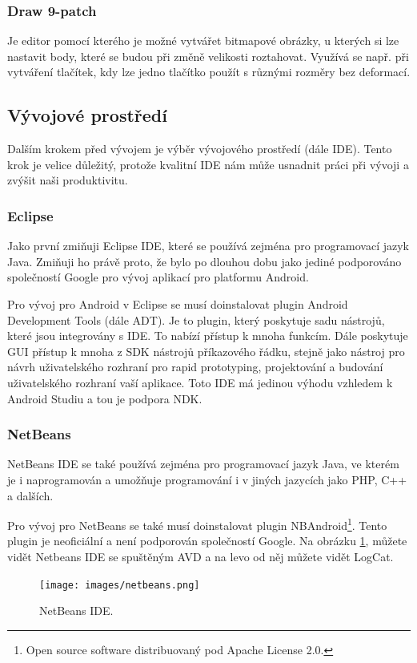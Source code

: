 \documentclass[12pt]{article}
\begin{document}
\subsubsection{Draw 9-patch}
Je editor pomocí kterého je možné vytvářet bitmapové obrázky, u kterých si lze nastavit body, které se budou při změně velikosti roztahovat. Využívá se např. při vytváření tlačítek, kdy lze jedno tlačítko použít s různými rozměry bez deformací.
\subsection{Vývojové prostředí}
Dalším krokem před vývojem je výběr vývojového prostředí (dále IDE). Tento krok je velice důležitý, protože kvalitní IDE nám může usnadnit práci při vývoji a zvýšit naši produktivitu.
\subsubsection{Eclipse}
Jako první zmiňuji Eclipse IDE, které se používá zejména pro programovací jazyk Java. Zmiňuji ho právě proto, že bylo po dlouhou dobu jako jediné podporováno společností Google pro vývoj aplikací pro platformu Android.

Pro vývoj pro Android v Eclipse se musí doinstalovat plugin Android Development Tools (dále ADT). Je to plugin, který poskytuje sadu nástrojů, které jsou integrovány s IDE. To nabízí přístup k mnoha funkcím. Dále poskytuje GUI přístup k mnoha z SDK nástrojů příkazového řádku, stejně jako nástroj pro návrh uživatelského rozhraní pro rapid prototyping, projektování a budování uživatelského rozhraní vaší aplikace. Toto IDE má jedinou výhodu vzhledem k Android Studiu a tou je podpora NDK. \cite{eclipse}
\subsubsection{NetBeans}
NetBeans IDE se také používá zejména pro programovací jazyk Java, ve kterém je i naprogramován a umožňuje programování i v jiných jazycích jako PHP, C++ a dalších.

Pro vývoj pro NetBeans se také musí doinstalovat plugin NBAndroid\footnote[6]{Open source software distribuovaný pod Apache License 2.0.}. Tento plugin je neoficiální a není podporován společností Google. Na obrázku \ref{netbeans}, můžete vidět Netbeans IDE se spuštěným AVD a na levo od něj můžete vidět LogCat.
\begin{figure}[ht]
\centerline{\texttt{[image: images/netbeans.png]}}
\caption{NetBeans IDE.} \label{netbeans}
\end{figure}
\newpage
\end{document}
